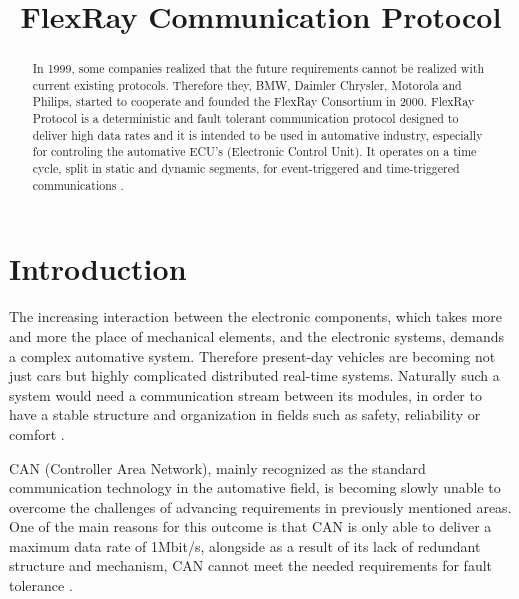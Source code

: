 \documentclass[conference]{IEEEtran}
\begin{document}
\title{FlexRay Communication Protocol\\
}

\author{
\and
{}

}

\maketitle

\begin{abstract}
In 1999, some companies realized that the future requirements cannot be realized with current existing protocols. Therefore they, BMW, Daimler Chrysler, Motorola and Philips, started to cooperate and founded the FlexRay Consortium in 2000\cite{reichart2005flexray}. FlexRay Protocol is a deterministic and fault tolerant communication protocol designed to deliver high data rates and it is intended to be used in automative industry, especially for controling the automative ECU's (Electronic Control Unit). It operates on a time cycle, split in static and dynamic segments, for event-triggered and time-triggered communications \cite{vaz2020efficient}.
\end{abstract}

\section{Introduction}
The increasing interaction between the electronic components, which takes more and more the place of mechanical elements, and the electronic systems, demands a complex automative system. Therefore present-day vehicles are becoming not just cars but highly complicated distributed real-time systems. Naturally such a system would need a communication stream between its modules, in order to have a stable structure and organization in fields such as safety, reliability or comfort \cite{steinbach2010comparing}.

CAN (Controller Area Network), mainly recognized as the standard communication technology in the automative field, is becoming slowly unable to overcome the challenges of advancing requirements in previously mentioned areas. One of the main reasons for this outcome is that CAN is only able to deliver a maximum data rate of 1Mbit/s, alongside as a result of its lack of redundant structure and mechanism, CAN cannot meet the needed requirements for fault tolerance \cite{makowitz2006flexray}.
\end{document}
